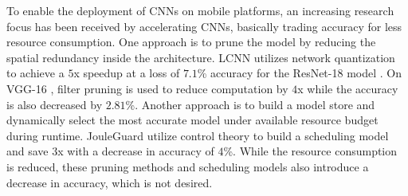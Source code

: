 \documentclass[pageno]{jpaper}
\begin{document}
To enable the deployment of CNNs on mobile platforms, an increasing research focus has been received by accelerating CNNs, basically trading accuracy for less resource consumption. One approach is to prune the model by reducing the spatial redundancy inside the architecture. LCNN \cite{bagherinezhad2017lcnn} utilizes network quantization to achieve a $5$x speedup at a loss of $7.1$\% accuracy for the ResNet-18 model \cite{he2016deep}. On VGG-16 \cite{simonyan2014very}, filter pruning \cite{lin2018accelerating} is used to reduce computation by $4$x while the accuracy is also decreased by $2.81$\%. Another approach is to build a model store and dynamically select the most accurate model under available resource budget during runtime. JouleGuard \cite{hoffmann2015jouleguard} utilize control theory to build a scheduling model and save $3$x with a decrease in accuracy of $4$\%. While the resource consumption is reduced, these pruning methods and scheduling models also introduce a decrease in accuracy, which is not desired.
\end{document}
